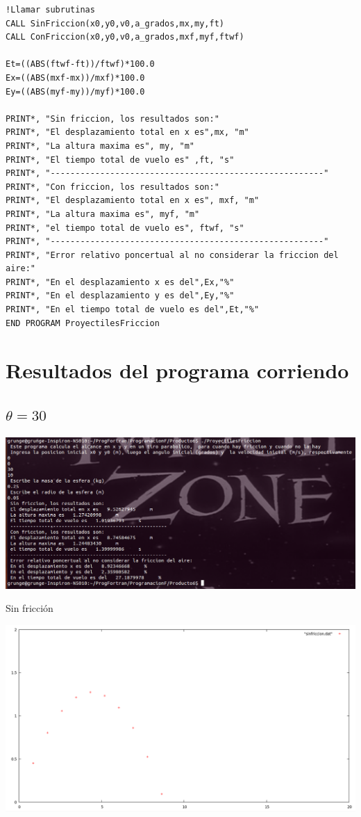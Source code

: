 \documentclass[notitlepage,12pt]{article}
\begin{document}
\begin{verbatim}
!Llamar subrutinas
CALL SinFriccion(x0,y0,v0,a_grados,mx,my,ft)
CALL ConFriccion(x0,y0,v0,a_grados,mxf,myf,ftwf)

Et=((ABS(ftwf-ft))/ftwf)*100.0
Ex=((ABS(mxf-mx))/mxf)*100.0
Ey=((ABS(myf-my))/myf)*100.0

PRINT*, "Sin friccion, los resultados son:"
PRINT*, "El desplazamiento total en x es",mx, "m"
PRINT*, "La altura maxima es", my, "m"
PRINT*, "El tiempo total de vuelo es" ,ft, "s"
PRINT*, "-------------------------------------------------------"
PRINT*, "Con friccion, los resultados son:"
PRINT*, "El desplazamiento total en x es", mxf, "m"
PRINT*, "La altura maxima es", myf, "m"
PRINT*, "el tiempo total de vuelo es", ftwf, "s"
PRINT*, "-------------------------------------------------------"
PRINT*, "Error relativo poncertual al no considerar la friccion del aire:"
PRINT*, "En el desplazamiento x es del",Ex,"%"
PRINT*, "En el desplazamiento y es del",Ey,"%"
PRINT*, "En el tiempo total de vuelo es del",Et,"%"
END PROGRAM ProyectilesFriccion
\end{verbatim}

\section{Resultados del programa corriendo}
\subsection{$\theta=30$}
\includegraphics[scale=0.4]{theta_30}


Sin fricci\'on

\includegraphics[scale=0.3]{theta_30_plot_nofriction}
\end{document}
